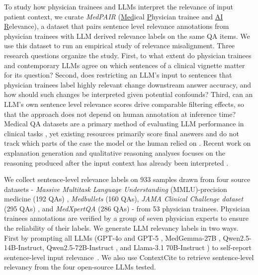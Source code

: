 \documentclass[fleqn,10pt]{wlscirep}
\begin{document}
To study how physician trainees and LLMs interpret the relevance of input patient context, we curate \emph{MedPAIR} (\underline{Med}ical \underline{P}hysician trainee and \underline{AI} \underline{R}elevance), a dataset that pairs sentence level relevance annotations from physician trainees with LLM derived relevance labels on the same QA items. We use this dataset to run an empirical study of relevance misalignment. Three research questions organize the study. First, to what extent do physician trainees and contemporary LLMs agree on which sentences of a clinical vignette matter for its question? Second, does restricting an LLM's input to sentences that physician trainees label highly relevant change downstream answer accuracy, and how should such changes be interpreted given potential confounds? Third, can an LLM's own sentence level relevance scores drive comparable filtering effects, so that the approach does not depend on human annotation at inference time? Medical QA datasets are a primary method of evaluating LLM performance in clinical tasks \cite{pal_medmcqa_2022, zhang_survey_2024, jin_rjua-meddqa_2024, soni_radqa_2022}, yet existing resources primarily score final answers and do not track which parts of the case the model or the human relied on \cite{toma_clinical_2023, adlakha_evaluating_2024, bedi2026medhelm}. Recent work on explanation generation and qualitative reasoning analyses focuses on the reasoning produced after the input context has already been interpreted \cite{khandekar2024medcalc}.

We collect sentence-level relevance labels on 933 samples drawn from four source datasets - \textit{Massive Multitask Language Understanding}  (MMLU)-precision medicine (192 QAs) \cite{hendrycks_measuring_2021}, \textit{Medbullets} (160 QAs), \textit{JAMA Clinical Challenge dataset} (295 QAs) \cite{chen_benchmarking_2025}, and \textit{MedXpertQA} (286 QAs) \cite{zuo_medxpertqa_2025} - from 53 physician trainees. Physician trainees annotations are verified by a group of seven physician experts to ensure the reliability of their labels.
We generate LLM relevancy labels in two ways. First by prompting all LLMs (GPT-4o \cite{hurst2024gpt} and GPT-5 \cite{singh2025openai}, MedGemma-27B \cite{sellergren2025medgemma}, Qwen2.5-14B-Instruct, Qwen2.5-72B-Instruct \cite{qwen_qwen25_2025}, and Llama-3.1 70B-Instruct \cite{grattafiori_llama_2024}) to self-report sentence-level input relevance~\cite{choi_identifying_2024, wang-etal-2025-medcite}. We also use ContextCite \cite{cohen-wang_contextcite_2024} to retrieve sentence-level relevancy from the four open-source LLMs tested. 
\end{document}
